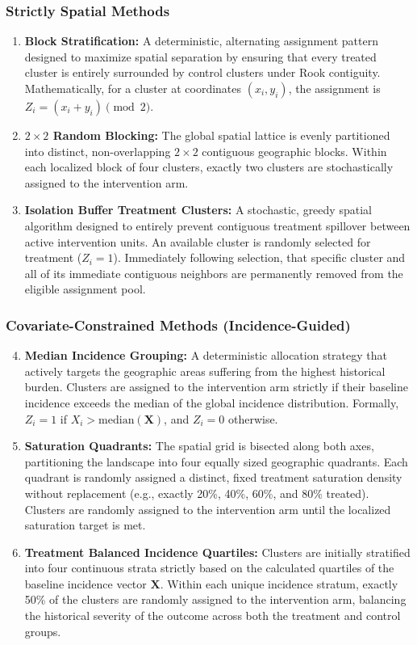 \documentclass[11pt]{article}
\begin{document}
\subsubsection{Strictly Spatial Methods}
\begin{enumerate}
    \item \textbf{Block Stratification:} A deterministic, alternating assignment pattern designed to maximize spatial separation by ensuring that every treated cluster is entirely surrounded by control clusters under Rook contiguity. Mathematically, for a cluster at coordinates $(x_i, y_i)$, the assignment is $Z_i = (x_i + y_i) \pmod 2$.
    \item \textbf{$2 \times 2$ Random Blocking:} The global spatial lattice is evenly partitioned into distinct, non-overlapping $2 \times 2$ contiguous geographic blocks. Within each localized block of four clusters, exactly two clusters are stochastically assigned to the intervention arm. 
    \item \textbf{Isolation Buffer Treatment Clusters:} A stochastic, greedy spatial algorithm designed to entirely prevent contiguous treatment spillover between active intervention units. An available cluster is randomly selected for treatment ($Z_i = 1$). Immediately following selection, that specific cluster and all of its immediate contiguous neighbors are permanently removed from the eligible assignment pool. 
\end{enumerate}

\subsubsection{Covariate-Constrained Methods (Incidence-Guided)}
\begin{enumerate}
    \setcounter{enumi}{3}
    \item \textbf{Median Incidence Grouping:} A deterministic allocation strategy that actively targets the geographic areas suffering from the highest historical burden. Clusters are assigned to the intervention arm strictly if their baseline incidence exceeds the median of the global incidence distribution. Formally, $Z_i = 1$ if $X_i > \text{median}(\bm{X})$, and $Z_i = 0$ otherwise.
    \item \textbf{Saturation Quadrants:} The spatial grid is bisected along both axes, partitioning the landscape into four equally sized geographic quadrants. Each quadrant is randomly assigned a distinct, fixed treatment saturation density without replacement (e.g., exactly 20\%, 40\%, 60\%, and 80\% treated). Clusters are randomly assigned to the intervention arm until the localized saturation target is met.
    \item \textbf{Treatment Balanced Incidence Quartiles:} Clusters are initially stratified into four continuous strata strictly based on the calculated quartiles of the baseline incidence vector $\bm{X}$. Within each unique incidence stratum, exactly 50\% of the clusters are randomly assigned to the intervention arm, balancing the historical severity of the outcome across both the treatment and control groups.
\end{enumerate}
\end{document}
